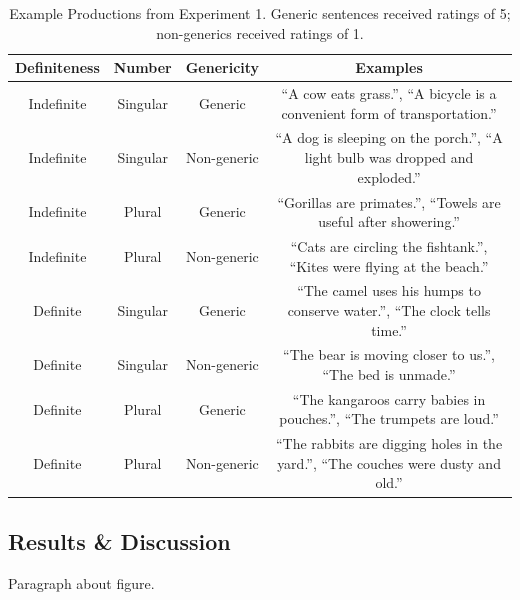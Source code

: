 \documentclass[10pt,letterpaper]{article}
\begin{document}
\begin{table}
\begin{center} 
\caption{Example Productions from Experiment 1. Generic sentences received ratings of 5; non-generics received ratings of 1.} 
\label{sample-table} 
\vskip 0.12in
\begin{tabular}{cccc} 
\hline
Definiteness    &  Number & Genericity & Examples \\
\hline
Indefinite        &   Singular & Generic & ``A cow eats grass.'', ``A bicycle is a convenient form of transportation.''\\
Indefinite  &   Singular & Non-generic & ``A dog is sleeping on the porch.'', ``A light bulb was dropped and exploded.''\\
Indefinite           &   Plural & Generic & ``Gorillas are primates.'', ``Towels are useful after showering.''\\
Indefinite         &   Plural  & Non-generic & ``Cats are circling the fishtank.'', ``Kites were flying at the beach.''\\
Definite        &   Singular & Generic & ``The camel uses his humps to conserve water.'', ``The clock tells time.''  \\
Definite  &   Singular & Non-generic & ``The bear is moving closer to us.'', ``The bed is unmade.''\\
Definite           &   Plural & Generic & ``The kangaroos carry babies in pouches.'', ``The trumpets are loud.'' \\
Definite         &   Plural & Non-generic & ``The rabbits are digging holes in the yard.'', ``The couches were dusty and old.''\\
\hline
\end{tabular} 
\end{center} 
\end{table}

\subsection{Results \& Discussion}

Paragraph about figure.
\end{document}
